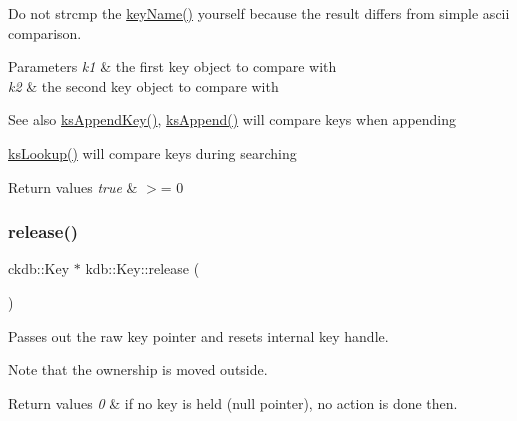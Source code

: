 Do not strcmp the \hyperlink{group__keyname_ga8e805c726a60da921d3736cda7813513}{key\+Name()} yourself because the result differs from simple ascii comparison.


\begin{DoxyParams}{Parameters}
{\em k1} & the first key object to compare with \\
\hline
{\em k2} & the second key object to compare with\\
\hline
\end{DoxyParams}
\begin{DoxySeeAlso}{See also}
\hyperlink{group__keyset_gaa5a1d467a4d71041edce68ea7748ce45}{ks\+Append\+Key()}, \hyperlink{group__keyset_ga21eb9c3a14a604ee3a8bdc779232e7b7}{ks\+Append()} will compare keys when appending 

\hyperlink{group__keyset_gaa34fc43a081e6b01e4120daa6c112004}{ks\+Lookup()} will compare keys during searching
\end{DoxySeeAlso}

\begin{DoxyRetVals}{Return values}
{\em true} & $>$= 0 \\
\hline
\end{DoxyRetVals}
\mbox{\label{classkdb_1_1Key_a9ae719043e6e99f5f3d6fb85837306f8}} 
\subsubsection{\texorpdfstring{release()}{release()}}
{\footnotesize\ttfamily ckdb\+::\+Key $\ast$ kdb\+::\+Key\+::release (\begin{DoxyParamCaption}{ }\end{DoxyParamCaption})\hspace{0.3cm}{\ttfamily [inline]}}



Passes out the raw key pointer and resets internal key handle. 

\begin{DoxyNote}{Note}
that the ownership is moved outside.
\end{DoxyNote}

\begin{DoxyRetVals}{Return values}
{\em 0} & if no key is held (null pointer), no action is done then. \\
\hline
\end{DoxyRetVals}
\mbox{\label{classkdb_1_1Key_a002af206119ceed17b106e2449cedc91}} 
